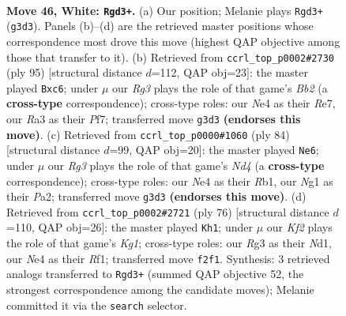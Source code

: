 \documentclass[11pt]{article}
\begin{document}
\clearpage

\begin{figure}[p]\centering
\begin{subfigure}{0.46\textwidth}\centering
\resizebox{\linewidth}{!}{%
\newchessgame
\chessboard[
  setfen={6r1/3k2br/4n3/5nPp/P3N3/R5R1/5KP1/6N1 w - - 1 46},
  showmover=false,
  pgfstyle=straightmove, color=movearrow, markmove={g3-d3}
]}
\caption{}
\end{subfigure}\hfill
\begin{subfigure}{0.46\textwidth}\centering
\resizebox{\linewidth}{!}{%
\newchessgame
\chessboard[
  setfen={5k2/1b2rpn1/2B1p3/N3P1p1/5P2/8/P7/K1R5 b - - 0 48},
  showmover=false,
  pgfstyle=straightmove, color=movearrow, markmove={b7-c6}
]}
\caption{}
\end{subfigure}
\\[4pt]
\begin{subfigure}{0.46\textwidth}\centering
\resizebox{\linewidth}{!}{%
\newchessgame
\chessboard[
  setfen={2r4k/2b4p/p7/8/2rN4/8/P1P1R2P/1R5K w - - 9 43},
  showmover=false,
  pgfstyle=straightmove, color=movearrow, markmove={d4-e6}
]}
\caption{}
\end{subfigure}\hfill
\begin{subfigure}{0.46\textwidth}\centering
\resizebox{\linewidth}{!}{%
\newchessgame
\chessboard[
  setfen={8/2r3k1/7p/6p1/8/6P1/1Rnr1P1P/3N1RK1 w - - 9 39},
  showmover=false,
  pgfstyle=straightmove, color=movearrow, markmove={g1-h1}
]}
\caption{}
\end{subfigure}
\caption{\textbf{Move 46, White: \texttt{Rgd3+}.} (a) Our position; Melanie plays \texttt{Rgd3+} (\texttt{g3d3}). Panels (b)--(d) are the retrieved master positions whose correspondence most drove this move (highest QAP objective among those that transfer to it). (b) Retrieved from \texttt{ccrl\_top\_p0002\#2730} (ply 95) [structural distance $d$=112, QAP obj=23]: the master played \texttt{Bxc6}; under $\mu$ our \emph{Rg3} plays the role of that game's \emph{Bb2} (a \textbf{cross-type} correspondence); cross-type roles: our \emph{N}e4 as their \emph{R}e7, our \emph{R}a3 as their \emph{P}f7; transferred move \texttt{g3d3} \textbf{(endorses this move)}. (c) Retrieved from \texttt{ccrl\_top\_p0000\#1060} (ply 84) [structural distance $d$=99, QAP obj=20]: the master played \texttt{Ne6}; under $\mu$ our \emph{Rg3} plays the role of that game's \emph{Nd4} (a \textbf{cross-type} correspondence); cross-type roles: our \emph{N}e4 as their \emph{R}b1, our \emph{N}g1 as their \emph{P}a2; transferred move \texttt{g3d3} \textbf{(endorses this move)}. (d) Retrieved from \texttt{ccrl\_top\_p0002\#2721} (ply 76) [structural distance $d$=110, QAP obj=26]: the master played \texttt{Kh1}; under $\mu$ our \emph{Kf2} plays the role of that game's \emph{Kg1}; cross-type roles: our \emph{R}g3 as their \emph{N}d1, our \emph{N}e4 as their \emph{R}f1; transferred move \texttt{f2f1}. Synthesis: 3 retrieved analogs transferred to \texttt{Rgd3+} (summed QAP objective 52, the strongest correspondence among the candidate moves); Melanie committed it via the \texttt{search} selector.}
\label{fig:thought-m90}
\end{figure}
\end{document}
